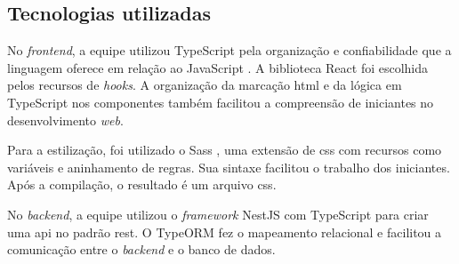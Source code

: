 \subsection{Tecnologias utilizadas}
  No \textit{frontend}, a equipe utilizou TypeScript \cite{typescript-docs}
pela organização e confiabilidade que a linguagem oferece em relação ao JavaScript \cite{ecma262}.
A biblioteca React \cite{react-docs} foi escolhida pelos recursos de
\textit{hooks}.
A organização da marcação \ac{html} e da lógica em TypeScript nos componentes
também facilitou a compreensão de iniciantes no desenvolvimento \textit{web}.

  Para a estilização, foi utilizado o Sass \cite{sass-docs}, uma extensão de
\ac{css} com recursos como variáveis e aninhamento de regras. Sua sintaxe facilitou
o trabalho dos iniciantes. Após a compilação, o resultado é um arquivo
\ac{css}.

  No \textit{backend}, a equipe utilizou o \textit{framework} NestJS
\cite{nestjs-docs} com TypeScript para criar uma \ac{api} no padrão \ac{rest}. O TypeORM
\cite{typeorm-docs} fez o mapeamento relacional e facilitou a comunicação entre o
\textit{backend} e o banco de dados.